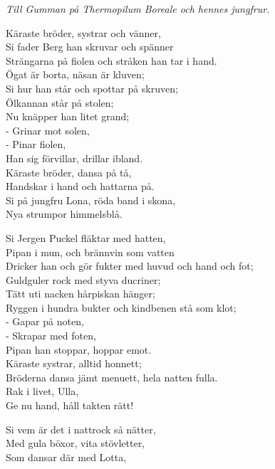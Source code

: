 {\footnotesize\textit{Till Gumman på Thermopilum Boreale och hennes jungfrur.}}\par
\vspace{10pt}
Käraste bröder, systrar och vänner,\\
Si fader Berg han skruvar och spänner\\
Strängarna på fiolen och stråken han tar i hand.\\
Ögat är borta, näsan är kluven;\\
Si hur han står och spottar på skruven;\\
Ölkannan står på stolen;\\
Nu knäpper han litet grand;\\
- Grinar mot solen,\\
- Pinar fiolen,\\
Han sig förvillar, drillar ibland.\\
Käraste bröder, dansa på tå,\\
Handskar i hand och hattarna på.\\
Si på jungfru Lona, röda band i skona,\\
Nya strumpor himmelsblå.\par
\vspace{10pt}
Si Jergen Puckel fläktar med hatten,\\
Pipan i mun, och brännvin som vatten\\
Dricker han och gör fukter med huvud och hand och fot;\\
Guldguler rock med styva ducriner;\\
Tätt uti nacken hårpiskan hänger;\\
Ryggen i hundra bukter och kindbenen stå som klot;\\
- Gapar på noten,\\
- Skrapar med foten,\\
Pipan han stoppar, hoppar emot.\\
Käraste systrar, alltid honnett;\\
Bröderna dansa jämt menuett, hela natten fulla.\\
Rak i livet, Ulla,\\
Ge nu hand, håll takten rätt!\par
\vspace{10pt}
Si vem är det i nattrock så nätter,\\
Med gula böxor, vita stövletter,\\
Som dansar där med Lotta,\\
